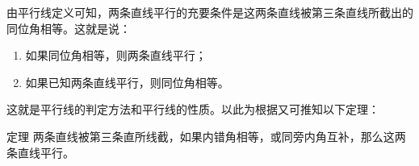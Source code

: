\begin{figure}
    \begin{minipage}[t]{0.48\linewidth}
    \centering
\begin{tikzpicture}[>=latex, scale=1]
    \end{tikzpicture}
    \caption{}
    \end{minipage}
    \begin{minipage}[t]{0.48\linewidth}
    \centering
    \begin{tikzpicture}[>=latex, scale=1]
    \end{tikzpicture}
    \caption{}
    \end{minipage}
    \end{figure}


由平行线定义可知，两条直线平行的充要条件是这两条直线被第三条直线所截出的同位角相等。这就是说：
\begin{enumerate}
\item 如果同位角相等，则两条直线平行；   
\item 如果已知两条直线平行，则同位角相等。 
\end{enumerate}
这就是平行线的判定方法和平行线的性质。以此为根据又可推知以下定理：

\begin{Theorem}{定理}
两条直线被第三条直所线截，如果内错角相等，或同旁内角互补，那么这两条直线平行。
\end{Theorem}

